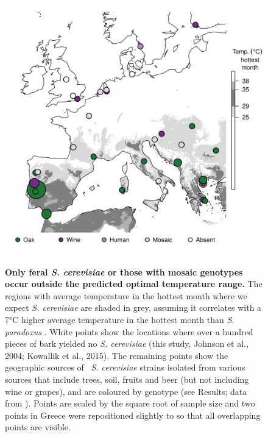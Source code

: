 \documentclass[12pt]{article}
\begin{document}
\begin{figure}[h!] \centering 
\includegraphics[width=1.0\textwidth]{../figs_tables/Figure5ScEurope.pdf} 
\caption{{\bf Only feral \textit{S. cerevisiae} or those with mosaic genotypes occur outside the predicted optimal temperature range.} The regions with average temperature in the hottest month where we expect \textit{S. cerevisiae} are shaded in grey, assuming it correlates with a 7\si{\degreeCelsius} higher average temperature in the hottest month than \textit{S. paradoxus} \citep{sweeney_sympatric_2004}. White points show the locations where over a hundred pieces of bark yielded no \textit{S. cerevisiae} (this study, Johnson et al., 2004; Kowallik et al., 2015). The remaining points show the geographic sources of \allcerineu\ \textit{S. cerevisiae} strains isolated from various sources that include trees, soil, fruits and beer (but not including wine or grapes), and are coloured by genotype (see Results; data from \citealp{cromie_genomic_2013,almeida_population_2015}). Points are scaled by the square root of sample size and two points in Greece were repositioned slightly to so that all overlapping points are visible.} 
\label{fig:eumap_figure} 
\end{figure}
\clearpage

\end{document}
